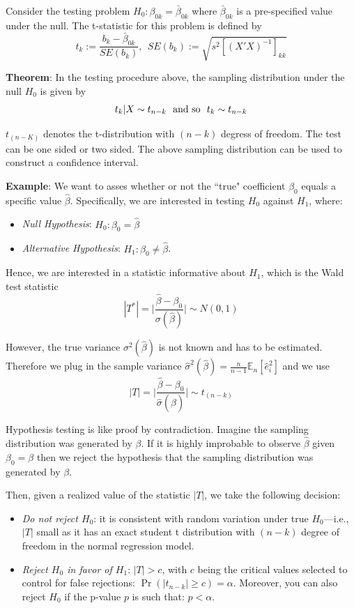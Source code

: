 \documentclass[12pt,]{book}
\providecommand{\tightlist}{%
  \setlength{\itemsep}{0pt}\setlength{\parskip}{0pt}}
\begin{document}
Consider the testing problem
\(H_0: \beta _ {0k} = \bar \beta _ {0k}\) where \(\bar \beta _ {0k}\) is a pre-specified value under the null.
The t-statistic for this problem is defined by
\[
  t_k:= \frac{b_k - \bar \beta _ {0k}}{SE(b_k)}, \ \ SE(b_k):= \sqrt{s^2 [(X'X)^{-1}] _ {kk}}
\]

\textbf{Theorem}: In the testing procedure above, the sampling distribution under the null \(H_0\) is given by
\[
    t_k|X \sim t _ {n-k} \ \ \text{and so} \ \ t_k \sim t _ {n-k} \\
\]

\(t _ {(n-K)}\) denotes the t-distribution with \((n-k)\) degress of freedom. The test can be one sided or two sided. The above sampling distribution can be used to construct a confidence interval.

\textbf{Example}:
We want to asses whether or not the ``true" coefficient \(\beta_0\) equals a specific value \(\hat \beta\). Specifically, we are interested in testing \(H_0\) against \(H_1\), where:

\begin{itemize}
\tightlist
\item
  \emph{Null Hypothesis}: \(H_0: \beta_0 = \hat \beta\)
\item
  \emph{Alternative Hypothesis}: \(H_1: \beta_0 \ne \hat \beta\).
\end{itemize}

Hence, we are interested in a statistic informative about \(H_1\), which is the Wald test statistic
\[
    |T^*| = \bigg| \frac{\hat \beta - \beta_0}{\sigma(\hat \beta)}\bigg|  \sim N(0,1)
\]

However, the true variance \(\sigma^2(\hat \beta )\) is not known and has to be estimated. Therefore we plug in the sample variance \(\hat \sigma^2(\hat \beta) = \frac{n}{n-1} \mathbb E_n[\hat e_i^2]\) and we use
\[
    |T| = \bigg| \frac{\hat \beta - \beta_0}{\hat \sigma (\hat \beta)}\bigg|  \sim t _ {(n-k)}
\]

Hypothesis testing is like proof by contradiction. Imagine the sampling distribution was generated by \(\beta\). If it is highly improbable to observe \(\hat \beta\) given \(\beta_0 = \beta\) then we reject the hypothesis that the sampling distribution was generated by \(\beta\).

Then, given a realized value of the statistic \(|T|\), we take the following decision:

\begin{itemize}
\tightlist
\item
  \emph{Do not reject \(H_0\)}: it is consistent with random variation under true \(H_0\)---i.e., \(|T|\) small as it has an exact student t distribution with \((n-k)\) degree of freedom in the normal regression model.
\item
  \emph{Reject \(H_0\) in favor of \(H_1\)}: \(|T| > c\), with \(c\) being the critical values selected to control for false rejections: \(\Pr(|t _ {n-k}| \geq c) = \alpha\). Moreover, you can also reject \(H_0\) if the p-value \(p\) is such that: \(p < \alpha\).
\end{itemize}
\end{document}
